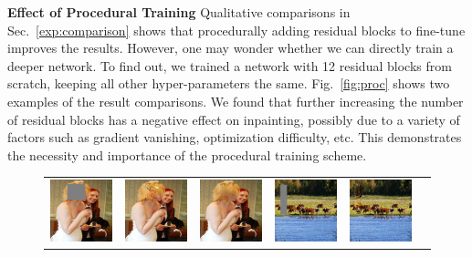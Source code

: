 \noindent\textbf{Effect of Procedural Training} Qualitative comparisons in Sec.~\ref{exp:comparison} shows that procedurally adding residual blocks to fine-tune improves the results. However, one may wonder whether we can directly train a deeper network. To find out, we trained a network with 12 residual blocks from scratch, keeping all other hyper-parameters the same. Fig.~\ref{fig:proc} shows two examples of the result comparisons. We found that further increasing the number of residual blocks has a negative effect on inpainting, possibly due to a variety of factors such as gradient vanishing, optimization difficulty, etc. This demonstrates the necessity and importance of the procedural training scheme.

\begin{figure}[!ht]
\centering
\small
\setlength\tabcolsep{1pt}
\begin{tabular}{cccccc}
\includegraphics[width=.17\textwidth]{figures/proc/000000241668_input_image.jpg}&
\includegraphics[width=.17\textwidth]{figures/proc/000000241668_synthesized_image-1.jpg}&
\includegraphics[width=.17\textwidth]{figures/proc/000000241668_synthesized_image.jpg}&
\includegraphics[width=.17\textwidth]{figures/proc/000000314034_input_image.jpg}&
\includegraphics[width=.17\textwidth]{figures/proc/000000314034_synthesized_image-1.jpg}&

\end{tabular}
\end{figure}
